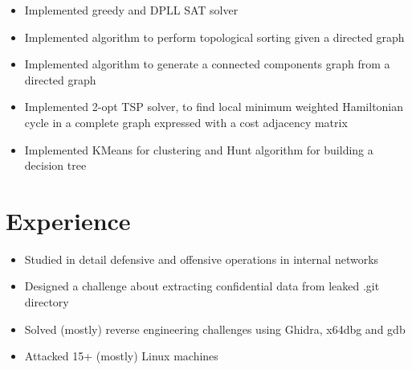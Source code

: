 \documentclass{resume}
\begin{document}
\begin{itemize}
  \item Implemented greedy and DPLL SAT solver
  \item Implemented algorithm to perform topological sorting given a directed graph
  \item Implemented algorithm to generate a connected components graph from a directed graph
  \item Implemented 2-opt TSP solver, to find local minimum weighted Hamiltonian cycle in a complete graph expressed with a cost adjacency matrix
  \item Implemented KMeans for clustering and Hunt algorithm for building a decision tree
\end{itemize}


\section{Experience}
\begin{itemize}
  \item Studied in detail defensive and offensive operations in internal networks
\end{itemize}

\begin{itemize}
  \item Designed a challenge about extracting confidential data from leaked .git directory
\end{itemize}

\begin{itemize}
  \item Solved (mostly) reverse engineering challenges using Ghidra, x64dbg and gdb
  \item Attacked 15+ (mostly) Linux machines
\end{itemize}
\end{document}
